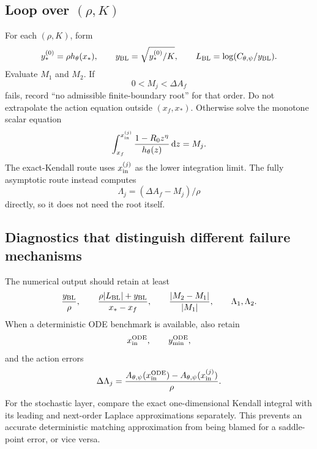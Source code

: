 \documentclass[11pt]{article}
\newcommand{\dd}{\,\mathrm{d}}
\begin{document}
\subsection{Loop over \texorpdfstring{\((\rho,K)\)}{(rho,K)}}
For each \((\rho,K)\), form
\[
y_*^{(0)}=\rho h_\theta(x_*),
\qquad
y_{\rm BL}=\sqrt{y_*^{(0)}/K},
\qquad
L_{\rm BL}=\log(C_{\theta,\psi}/y_{\rm BL}).
\]
Evaluate \(M_1\) and \(M_2\). If\[
0<M_j<\Delta A_f
\]
fails, record ``no admissible finite-boundary root'' for that order. Do not extrapolate the action equation outside \((x_f,x_*)\). Otherwise solve the monotone scalar equation
\[
\int_{x_f}^{x_{\rm in}^{(j)}}\frac{1-R_0z^\eta}{h_\theta(z)}\dd z=M_j.
\]
The exact-Kendall route uses \(x_{\rm in}^{(j)}\) as the lower integration limit. The fully asymptotic route instead computes
\[
\Lambda_j=(\Delta A_f-M_j)/\rho
\]
directly, so it does not need the root itself.

\subsection{Diagnostics that distinguish different failure mechanisms}
The numerical output should retain at least
\[
\frac{y_{\rm BL}}\rho,
\qquad
\frac{\rho|L_{\rm BL}|+y_{\rm BL}}{x_*-x_f},
\qquad
\frac{|M_2-M_1|}{|M_1|},
\qquad
\Lambda_1,\Lambda_2.
\]
When a deterministic ODE benchmark is available, also retain
\[
x_{\rm in}^{\rm ODE},\qquad y_{\min}^{\rm ODE},
\]
and the action errors
\[
\Delta\Lambda_j
=\frac{A_{\theta,\psi}(x_{\rm in}^{\rm ODE})
-A_{\theta,\psi}(x_{\rm in}^{(j)})}{\rho}.
\]
For the stochastic layer, compare the exact one-dimensional Kendall integral with its leading and next-order Laplace approximations separately. This prevents an accurate deterministic matching approximation from being blamed for a saddle-point error, or vice versa.
\end{document}
